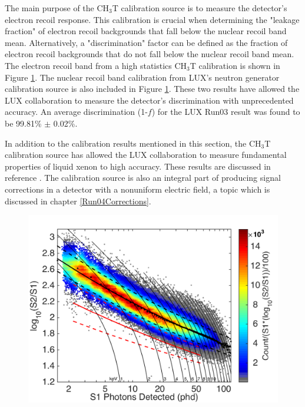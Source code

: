 \documentclass[a4paper,12pt]{article}
\begin{document}
{The main purpose of the CH$_3$T calibration source is to measure the detector's electron recoil response.  This calibration is crucial when determining the "leakage fraction" of electron recoil backgrounds that fall below the nuclear recoil band mean.  Alternatively, a "discrimination" factor can be defined as the fraction of electron recoil backgrounds that do not fall below the nuclear recoil band mean.  The electron recoil band from a high statistics CH$_3$T calibration is shown in Figure \ref{TritiumERBand}.  The nuclear recoil band calibration from LUX's neutron generator calibration source is also included in Figure \ref{TritiumERBand}. These two results have allowed the LUX collaboration to measure the detector's discrimination with unprecedented accuracy.  An average discrimination (1-$f$) for the LUX Run03 result was found to be 99.81\% $\pm$ 0.02\%.

In addition to the calibration results mentioned in this section, the CH$_3$T calibration source has allowed the LUX collaboration to measure fundamental properties of liquid xenon to high accuracy.  These results are discussed in reference \cite{TritiumPaper}.  The calibration source is also an integral part of producing signal corrections in a detector with a nonuniform electric field, a topic which is discussed in chapter \ref{Run04Corrections}.

\newpage 

\begin{figure} [!h]
\includegraphics[scale=.35]{TritiumERBand.pdf} 
\label{TritiumERBand}
\end{figure}

}
\end{document}

